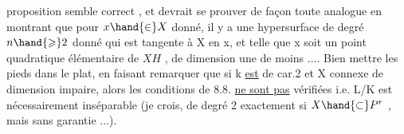 
proposition semble correct , et devrait se prouver de façon toute analogue
en montrant que pour $x\hand{\in} X$ donné, il y a une hypersurface  de degré $n\hand{\geqslant} 2$
donné qui est tangente à X en x, et telle que x soit un point quadratique
élémentaire de $X$\hand{$\cap$}$H$ , de dimension une de moins .... Bien mettre les
pieds dans le plat, en faisant remarquer que si k \uline{est} de car.2 et X
connexe  de dimension impaire, alors les conditions de 8.8. \uline{ne sont pas}
vérifiées i.e. L/K est nécessairement inséparable (je crois, de degré
2 exactement si $X\hand{\subset} P^r$ , mais sans garantie ...).


